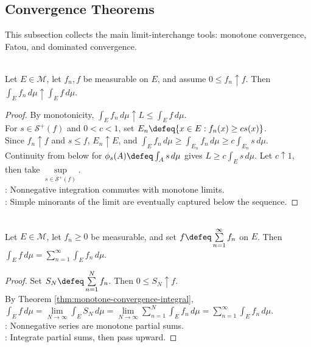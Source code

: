 \subsection{Convergence Theorems}

%

This subsection collects the main limit-interchange tools: monotone convergence, Fatou, and dominated convergence.

\begin{theorem} \label{thm:monotone-convergence-integral} \\
Let $E\in\mathcal{M}$, let $f_n,f$ be measurable on $E$, and assume $0\leq f_n\uparrow f$. Then $\int_E f_n\,d\mu\uparrow\int_E f\,d\mu$.
\begin{proof}
By monotonicity, $\int_Ef_n\,d\mu\uparrow L\leq\int_Ef\,d\mu$.\\
For $s\in\mathcal{S}^+(f)$ and $0<c<1$, set $E_n\defeq\{x\in E:f_n(x)\geq cs(x)\}$.\\
Since $f_n\uparrow f$ and $s\leq f$, $E_n\uparrow E$, and $\int_Ef_n\,d\mu\geq\int_{E_n}f_n\,d\mu\geq c\int_{E_n}s\,d\mu$.\\
Continuity from below for $\phi_s(A)\defeq\int_As\,d\mu$ gives $L\geq c\int_Es\,d\mu$. Let $c\uparrow1$, then take $\sup\limits_{s\in\mathcal{S}^+(f)}$.\\
: Nonnegative integration commutes with monotone limits.\\
: Simple minorants of the limit are eventually captured below the sequence.
\end{proof}
\end{theorem}

\begin{theorem} \label{thm:nonnegative-series-integral} \\
Let $E\in\mathcal{M}$, let $f_n\geq0$ be measurable, and set $f\defeq\sum\limits_{n=1}^{\infty}f_n$ on $E$. Then $\int_E f\,d\mu=\sum\limits_{n=1}^{\infty}\int_E f_n\,d\mu$.
\begin{proof} Set $S_N\defeq\sum\limits_{n=1}^{N}f_n$. Then $0\leq S_N\uparrow f$.\\
By Theorem \ref{thm:monotone-convergence-integral}, $\int_Ef\,d\mu=\lim\limits_{N\to\infty}\int_ES_N\,d\mu =\lim\limits_{N\to\infty}\sum\limits_{n=1}^{N}\int_Ef_n\,d\mu =\sum\limits_{n=1}^{\infty}\int_Ef_n\,d\mu$.\\
: Nonnegative series are monotone partial sums.\\
: Integrate partial sums, then pass upward.
\end{proof}
\end{theorem}

